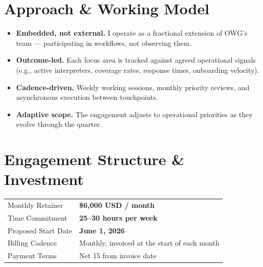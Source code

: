 \documentclass{proposal}
\begin{document}
\section{Approach \& Working Model}

\begin{itemize}[leftmargin=1.5em, itemsep=4pt, topsep=4pt]
  \item \textbf{Embedded, not external.} I operate as a fractional
        extension of OWG's team --- participating in workflows, not
        observing them.
  \item \textbf{Outcome-led.} Each focus area is tracked against agreed
        operational signals (e.g., active interpreters, coverage rates,
        response times, onboarding velocity).
  \item \textbf{Cadence-driven.} Weekly working sessions, monthly
        priority reviews, and asynchronous execution between touchpoints.
  \item \textbf{Adaptive scope.} The engagement adjusts to operational
        priorities as they evolve through the quarter.
\end{itemize}

\section{Engagement Structure \& Investment}

\renewcommand{\arraystretch}{1.35}
\begin{tabularx}{\linewidth}{@{}>{\raggedright\arraybackslash}p{4.6cm} X@{}}
\toprule
\textcolor{TPGray}{\sffamily\small Monthly Retainer} &
\sffamily\textbf{\$6{,}000 USD / month} \\
\textcolor{TPGray}{\sffamily\small Time Commitment} &
\sffamily \textbf{25--30 hours per week} \\
\textcolor{TPGray}{\sffamily\small Proposed Start Date} &
\sffamily \textbf{June 1, 2026} \\
\textcolor{TPGray}{\sffamily\small Billing Cadence} &
\sffamily Monthly, invoiced at the start of each month \\
\textcolor{TPGray}{\sffamily\small Payment Terms} &
\sffamily Net 15 from invoice date \\
\bottomrule
\end{tabularx}

\vspace{8pt}
\end{document}
